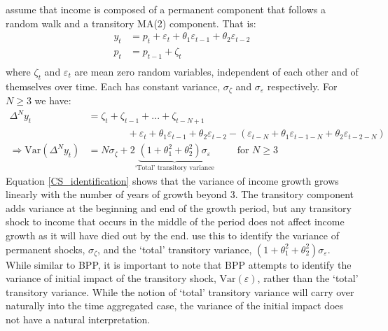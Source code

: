 \documentclass[titlepage]{\econtex}\newcommand{\texname}{ConsumptionHeterogeneity}
\begin{document}
\cite{carroll_nature_1997} assume that income is composed of a permanent component that follows a random walk and a transitory MA(2) component. That is:
	\begin{align*}
	y_t &= p_t + \varepsilon_t + \theta_1 \varepsilon_{t-1} + \theta_2 \varepsilon_{t-2} \\
	p_t &= p_{t-1} +\zeta_t\\
	\end{align*}
where $\zeta_t$ and $\varepsilon_t$ are mean zero random variables, independent of each other and of themselves over time. Each has constant variance, $\sigma_{\zeta}$ and $\sigma_{\varepsilon}$ respectively. For $N \geq 3$ we have:
\begin{align}
\Delta^N y_t &= \zeta_t + \zeta_{t-1} + ... + \zeta_{t-N+1} \nonumber \\
& \qquad \qquad + \varepsilon_t + \theta_1 \varepsilon_{t-1} + \theta_2 \varepsilon_{t-2} - (\varepsilon_{t-N} + \theta_1 \varepsilon_{t-1-N} + \theta_2 \varepsilon_{t-2-N}) \nonumber \\ 
\Rightarrow \mathrm{Var}(\Delta^N y_t) &= N \sigma_{\zeta} + 2\underbrace{(1+\theta_1^2 + \theta_2^2)\sigma_{\varepsilon}}_\text{`Total' transitory variance} \qquad \text{ for $N \geq 3$} \label{CS_identification}
\end{align}
Equation \ref{CS_identification} shows that the variance of income growth grows linearly with the number of years of growth beyond 3. The transitory component adds variance at the beginning and end of the growth period, but any transitory shock to income that occurs in the middle of the period does not affect income growth as it will have died out by the end. \cite{carroll_nature_1997} use this to identify the variance of permanent shocks, $\sigma_{\zeta}$, and the `total' transitory variance, $(1+\theta_1^2 + \theta_2^2)\sigma_{\varepsilon}$. While similar to BPP, it is important to note that BPP attempts to identify the variance of initial impact of the transitory shock, $\mathrm{Var}(\varepsilon)$, rather than the `total' transitory variance. While the notion of `total' transitory variance will carry over naturally into the time aggregated case, the variance of the initial impact does not have a natural interpretation.
\end{document}
